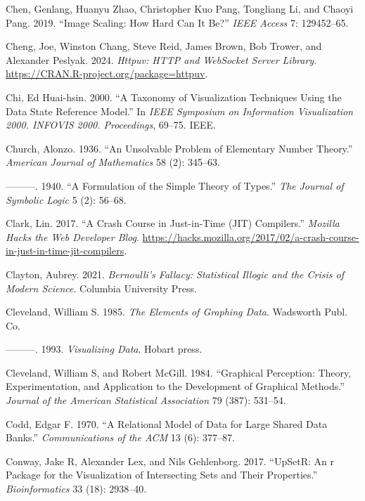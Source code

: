 \documentclass[
  openany]{book}
\newlength{\cslhangindent}
\newenvironment{CSLReferences}[2] %
 {\begin{list}{}{%
  \setlength{\itemindent}{0pt}
  \setlength{\leftmargin}{0pt}
  \setlength{\parsep}{0pt}
  \ifodd #1
   \setlength{\leftmargin}{\cslhangindent}
   \setlength{\itemindent}{-1\cslhangindent}
  \fi
  \setlength{\itemsep}{#2\baselineskip}}}
 {\end{list}}
\theoremstyle{definition}
\theoremstyle{definition}
\theoremstyle{definition}
\theoremstyle{definition}
\theoremstyle{remark}
\begin{document}
\begin{CSLReferences}{1}{0}
Chen, Genlang, Huanyu Zhao, Christopher Kuo Pang, Tongliang Li, and Chaoyi Pang. 2019. {``Image Scaling: How Hard Can It Be?''} \emph{IEEE Access} 7: 129452--65.

Cheng, Joe, Winston Chang, Steve Reid, James Brown, Bob Trower, and Alexander Peslyak. 2024. \emph{Httpuv: HTTP and WebSocket Server Library}. \url{https://CRAN.R-project.org/package=httpuv}.

Chi, Ed Huai-hsin. 2000. {``A Taxonomy of Visualization Techniques Using the Data State Reference Model.''} In \emph{IEEE Symposium on Information Visualization 2000. INFOVIS 2000. Proceedings}, 69--75. IEEE.

Church, Alonzo. 1936. {``An Unsolvable Problem of Elementary Number Theory.''} \emph{American Journal of Mathematics} 58 (2): 345--63.

---------. 1940. {``A Formulation of the Simple Theory of Types.''} \emph{The Journal of Symbolic Logic} 5 (2): 56--68.

Clark, Lin. 2017. {``A Crash Course in Just-in-Time (JIT) Compilers.''} \emph{Mozilla Hacks {\textendash} the Web Developer Blog}. \url{https://hacks.mozilla.org/2017/02/a-crash-course-in-just-in-time-jit-compilers}.

Clayton, Aubrey. 2021. \emph{Bernoulli's Fallacy: Statistical Illogic and the Crisis of Modern Science}. Columbia University Press.

Cleveland, William S. 1985. \emph{The Elements of Graphing Data}. Wadsworth Publ. Co.

---------. 1993. \emph{Visualizing Data}. Hobart press.

Cleveland, William S, and Robert McGill. 1984. {``Graphical Perception: Theory, Experimentation, and Application to the Development of Graphical Methods.''} \emph{Journal of the American Statistical Association} 79 (387): 531--54.

Codd, Edgar F. 1970. {``A Relational Model of Data for Large Shared Data Banks.''} \emph{Communications of the ACM} 13 (6): 377--87.

Conway, Jake R, Alexander Lex, and Nils Gehlenborg. 2017. {``UpSetR: An r Package for the Visualization of Intersecting Sets and Their Properties.''} \emph{Bioinformatics} 33 (18): 2938--40.


\end{CSLReferences}
\end{document}
